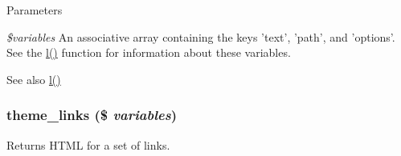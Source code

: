 \begin{DoxyParams}{Parameters}
\item[{\em \$variables}]An associative array containing the keys 'text', 'path', and 'options'. See the \hyperlink{common_8inc_ad3b36c06dc46250b8d22b8d0d2e7bd97}{l()} function for information about these variables.\end{DoxyParams}
\begin{DoxySeeAlso}{See also}
\hyperlink{common_8inc_ad3b36c06dc46250b8d22b8d0d2e7bd97}{l()} 
\end{DoxySeeAlso}
\hypertarget{group__themeable_gab75b290dbc9541e2fb0d9e57cbcdda5c}{
\subsubsection[{theme\_\-links}]{\setlength{\rightskip}{0pt plus 5cm}theme\_\-links (\$ {\em variables})}}
\label{group__themeable_gab75b290dbc9541e2fb0d9e57cbcdda5c}
Returns HTML for a set of links.


